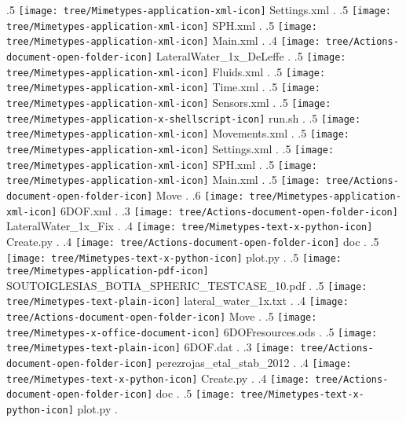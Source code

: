 {.5 { \texttt{[image: tree/Mimetypes-application-xml-icon]} Settings.xml }.
.5 { \texttt{[image: tree/Mimetypes-application-xml-icon]} SPH.xml }.
.5 { \texttt{[image: tree/Mimetypes-application-xml-icon]} Main.xml }.
.4 { \texttt{[image: tree/Actions-document-open-folder-icon]} LateralWater\_1x\_DeLeffe }.
.5 { \texttt{[image: tree/Mimetypes-application-xml-icon]} Fluids.xml }.
.5 { \texttt{[image: tree/Mimetypes-application-xml-icon]} Time.xml }.
.5 { \texttt{[image: tree/Mimetypes-application-xml-icon]} Sensors.xml }.
.5 { \texttt{[image: tree/Mimetypes-application-x-shellscript-icon]} run.sh }.
.5 { \texttt{[image: tree/Mimetypes-application-xml-icon]} Movements.xml }.
.5 { \texttt{[image: tree/Mimetypes-application-xml-icon]} Settings.xml }.
.5 { \texttt{[image: tree/Mimetypes-application-xml-icon]} SPH.xml }.
.5 { \texttt{[image: tree/Mimetypes-application-xml-icon]} Main.xml }.
.5 { \texttt{[image: tree/Actions-document-open-folder-icon]} Move }.
.6 { \texttt{[image: tree/Mimetypes-application-xml-icon]} 6DOF.xml }.
.3 { \texttt{[image: tree/Actions-document-open-folder-icon]} LateralWater\_1x\_Fix }.
.4 { \texttt{[image: tree/Mimetypes-text-x-python-icon]} Create.py }.
.4 { \texttt{[image: tree/Actions-document-open-folder-icon]} doc }.
.5 { \texttt{[image: tree/Mimetypes-text-x-python-icon]} plot.py }.
.5 { \texttt{[image: tree/Mimetypes-application-pdf-icon]} SOUTOIGLESIAS\_BOTIA\_SPHERIC\_TESTCASE\_10.pdf }.
.5 { \texttt{[image: tree/Mimetypes-text-plain-icon]} lateral\_water\_1x.txt }.
.4 { \texttt{[image: tree/Actions-document-open-folder-icon]} Move }.
.5 { \texttt{[image: tree/Mimetypes-x-office-document-icon]} 6DOFresources.ods }.
.5 { \texttt{[image: tree/Mimetypes-text-plain-icon]} 6DOF.dat }.
.3 { \texttt{[image: tree/Actions-document-open-folder-icon]} perezrojas\_etal\_stab\_2012 }.
.4 { \texttt{[image: tree/Mimetypes-text-x-python-icon]} Create.py }.
.4 { \texttt{[image: tree/Actions-document-open-folder-icon]} doc }.
.5 { \texttt{[image: tree/Mimetypes-text-x-python-icon]} plot.py }.
}
